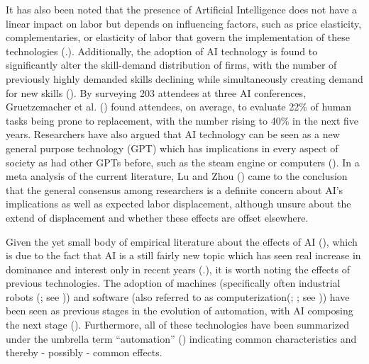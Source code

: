 \documentclass[
  12pt,
  a4paperpaper,
]{article}
\begin{document}
It has also been noted that the presence of Artificial Intelligence does
not have a linear impact on labor but depends on influencing factors,
such as price elasticity, complementaries, or elasticity of labor that
govern the implementation of these technologies
(.). Additionally, the adoption of AI technology is found to
significantly alter the skill-demand distribution of firms, with the
number of previously highly demanded skills declining while
simultaneously creating demand for new skills
(). By
surveying 203 attendees at three AI conferences, Gruetzemacher et al.
() found
attendees, on average, to evaluate 22\% of human tasks being prone to
replacement, with the number rising to 40\% in the next five years.
Researchers have also argued that AI technology can be seen as a new
general purpose technology (GPT) which has implications in every aspect
of society as had other GPTs before, such as the steam engine or
computers (). In a meta analysis of the current literature, Lu
and Zhou () came to the
conclusion that the general consensus among researchers is a definite
concern about AI's implications as well as expected labor displacement,
although unsure about the extend of displacement and whether these
effects are offset elsewhere.

Given the yet small body of empirical literature about the effects of AI
(), which is
due to the fact that AI is a still fairly new topic which has seen real
increase in dominance and interest only in recent years
(.), it
is worth noting the effects of previous technologies. The adoption of
machines (specifically often industrial robots
(; see
)) and
software (also referred to as
computerization(;
; see
))
have been seen as previous stages in the evolution of automation, with
AI composing the next stage
().
Furthermore, all of these technologies have been summarized under the
umbrella term ``automation'' () indicating common characteristics and thereby -
possibly - common effects.
\end{document}
